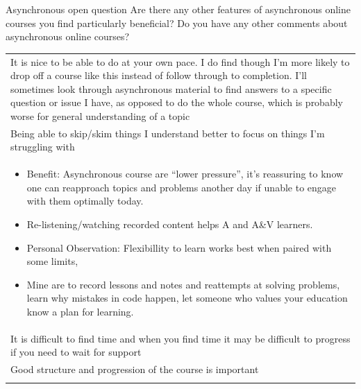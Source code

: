 \documentclass[
  ignorenonframetext,
]{beamer}
\begin{document}
\begin{frame}{Asynchronous open question}
\label{asynchronous-open-question}
Are there any other features of asynchronous online courses you find
particularly beneficial? Do you have any other comments about
asynchronous online courses?

\begin{longtable}[]{@{}
  >{\raggedright\arraybackslash}p{}@{}}
\toprule\noalign{}
\endhead
It is nice to be able to do at your own pace. I do find though I'm more
likely to drop off a course like this instead of follow through to
completion. I'll sometimes look through asynchronous material to find
answers to a specific question or issue I have, as opposed to do the
whole course, which is probably worse for general understanding of a
topic \\
Being able to skip/skim things I understand better to focus on things
I'm struggling with \\
\begin{minipage}[t]{\linewidth}\raggedright
\begin{itemize}
\item
  Benefit: Asynchronous course are ``lower pressure'', it's reassuring
  to know one can reapproach topics and problems another day if unable
  to engage with them optimally today.
\item
  Re-listening/watching recorded content helps A and A\&V learners.
\item
  Personal Observation: Flexibillity to learn works best when paired
  with some limits,
\item
  Mine are to record lessons and notes and reattempts at solving
  problems, learn why mistakes in code happen, let someone who values
  your education know a plan for learning.
\end{itemize}
\end{minipage} \\
It is difficult to find time and when you find time it may be difficult
to progress if you need to wait for support \\
Good structure and progression of the course is important \\
\bottomrule\noalign{}
\end{longtable}
\end{frame}
\end{document}
